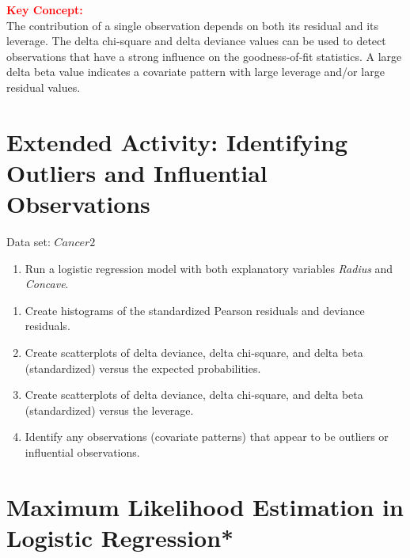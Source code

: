 \documentclass[
]{report}
\providecommand{\tightlist}{%
  \setlength{\itemsep}{0pt}\setlength{\parskip}{0pt}}
\begin{document}
\large

\textbf{\textcolor{red}{Key Concept:}}\\
\color{red}
The contribution of a single observation depends on both its residual and its leverage. The delta chi‐square and delta deviance values can be used to detect observations that have a strong influence on the goodness‐of‐fit statistics. A large delta beta value indicates a covariate pattern with large leverage and/or large residual values.\\
\color{black}
\normalsize

\section*{Extended Activity: Identifying Outliers and Influential Observations}\label{extended-activity-identifying-outliers-and-influential-observations}

Data set: \(Cancer2\)

\begin{enumerate}
\def\labelenumi{\arabic{enumi}.}
\setcounter{enumi}{32}
\tightlist
\item
  Run a logistic regression model with both explanatory variables \emph{Radius} and \emph{Concave}.\\
\end{enumerate}

\begin{enumerate}
\def\labelenumi{\alph{enumi}.}
\tightlist
\item
  Create histograms of the standardized Pearson residuals and deviance residuals.\\
\item
  Create scatterplots of delta deviance, delta chi‐square, and delta beta (standardized) versus the expected probabilities.\\
\item
  Create scatterplots of delta deviance, delta chi‐square, and delta beta (standardized) versus the leverage.\\
\item
  Identify any observations (covariate patterns) that appear to be outliers or influential observations.
\end{enumerate}

\section{\texorpdfstring{\textbf{Maximum Likelihood Estimation in Logistic Regression}*}{Maximum Likelihood Estimation in Logistic Regression*}}\label{maximum-likelihood-estimation-in-logistic-regression}
\end{document}
